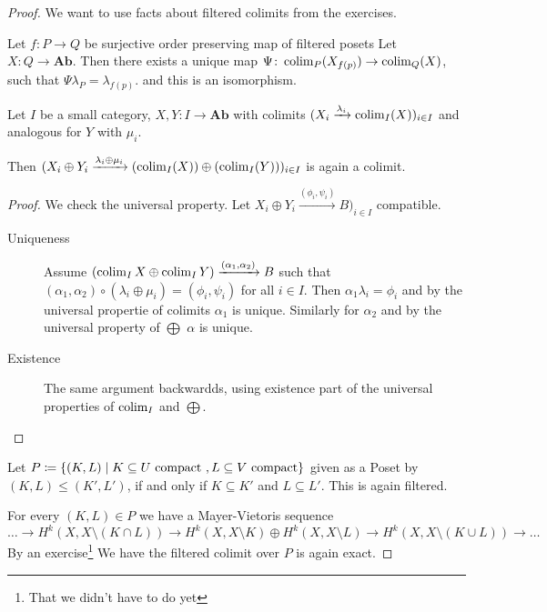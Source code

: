 \documentclass[language=english]{TemplateLecture}
\begin{document}
\begin{construction}
    \begin{proof}
        We want to use facts about filtered colimits from the exercises.

        \begin{lemma}
            Let \(f\colon P \to Q\) be surjective order preserving map of filtered posets Let \(X \colon Q \to \mathbf{Ab}\). Then there exists a unique map \(\Psi\colon \operatorname*{\mathrm{colim}}_{P}(X_{f(p)}) \to \operatorname*{\mathrm{colim}}_Q(X)\), such that \(\Psi \lambda_P = \lambda_{f(p)}\). and this is an isomorphism.
        \end{lemma}

        \begin{lemma}
            Let \(I\) be a small category, \(X,Y \colon I \to \mathbf{Ab}\) with colimits \((X_i \xrightarrow{\lambda_i} \operatorname*{\mathrm{colim}}_I(X))_{i \in I}\) and analogous for \(Y\) with \(\mu_i\).

            Then \((X_i \oplus Y_i \xrightarrow{\lambda_i \oplus \mu_i} (\operatorname*{\mathrm{colim}}_I(X)) \oplus (\operatorname*{\mathrm{colim}}_I(Y)))_{i \in I}\) is again a colimit.
        \end{lemma}
        \begin{proof}
            We check the universal property. Let \(X_i \oplus Y_i \xrightarrow{(\phi_i , \psi_i)} B)_{i \in I}\) compatible.
            \begin{description}
                \item[Uniqueness] Assume \((\operatorname*{\mathrm{colim}}_I X \oplus \operatorname*{\mathrm{colim}}_I Y) \xrightarrow{(\alpha_1, \alpha_2)} B\) such that \((\alpha_1, \alpha_2) \circ (\lambda_i \oplus \mu_i) = (\phi_i, \psi_i)\) for all \(i \in I\). Then \(\alpha_1 \lambda_i = \phi_i\) and by the universal propertie of colimits \(\alpha_1\) is unique. Similarly for \(\alpha_2\) and by the universal property of \(\bigoplus\) \(\alpha\) is unique.
                \item[Existence] The same argument backwardds, using existence part of the universal properties of \(\operatorname*{\mathrm{colim}}_I\) and \(\bigoplus\). 
            \end{description}
        \end{proof}

        Let \(P \coloneq \{(K,L) \mid K \subseteq U \text{ compact }, L \subseteq V \text{ compact}\}\) given as a Poset by \((K,L) \leq (K', L
        ')\), if and only if \(K \subseteq K'\) and \(L \subseteq L'\). This is again filtered.

        For every \((K,L) \in P\) we have a Mayer-Vietoris sequence
        \[\dots \to H^k(X, X\setminus (K \cap L)) \to H^k(X, X\setminus K) \oplus H^k(X, X\setminus L) \to H^k(X, X\setminus(K \cup L)) \to \dots\]
        By an exercise\footnote{That we didn't have to do yet} We have the filtered colimit over \(P\) is again exact.


\end{proof}
\end{construction}
\end{document}
